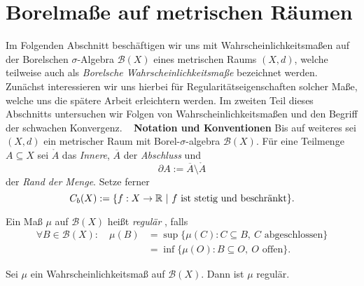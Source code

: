 \section{Borelmaße auf metrischen Räumen}
Im Folgenden Abschnitt beschäftigen wir uns mit Wahrscheinlichkeitsmaßen auf der Borelschen $\sigma$-Algebra $\mathcal{B}(X)$ eines metrischen Raums $(X,d)$, 
welche teilweise auch als \textit{Borelsche Wahrscheinlichkeitsmaße} bezeichnet werden. 
Zunächst interessieren wir uns hierbei für Regularitätseigenschaften solcher Maße, welche uns die spätere Arbeit erleichtern werden. 
Im zweiten Teil dieses Abschnitts untersuchen wir Folgen von Wahrscheinlichkeitsmaßen und den Begriff der schwachen Konvergenz. 
\newline \ \newline 
\textbf{Notation und Konventionen} 
\newline
Bis auf weiteres sei $(X,d)$ ein metrischer Raum mit Borel-$\sigma$-algebra $\mathcal{B}(X)$. 
Für eine Teilmenge $A \subseteq X$ sei $\mathring{A}$ das \textit{Innere}, $\overline{A}$ der \textit{Abschluss} und 
$$
    \partial A := \overline{A} \setminus \mathring{A}
$$
der \textit{Rand der Menge}. 
Setze ferner 
$$
    C_b(X) := \{f:X \to \mathbb{R} \ | \ f \text{ ist stetig und beschränkt} \}.
$$ 

\begin{mydef}
    Ein Maß $\mu$ auf $\mathcal{B}(X)$ heißt \textit{regulär} , falls
    \begin{align*}
        \forall B \in \mathcal{B}(X): \quad \mu(B) &= \sup\{\mu(C): C \subseteq B, \ C \text{ abgeschlossen} \} \\\
                                                   &= \inf\{\mu(O): B \subseteq O, \ O \text{ offen} \}.  
    \end{align*}  
\end{mydef}

\begin{proposition}
    Sei $\mu$ ein Wahrscheinlichkeitsmaß auf $\mathcal{B}(X)$. Dann ist $\mu$ regulär. 
\end{proposition}

